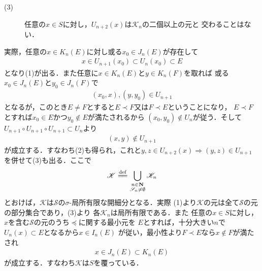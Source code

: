 \begin{prf}
\begin{description}
\begin{description}
					\item[(3)] 任意の$x \in S$に対し，$U_{n+2}(x)$は$\mathscr{K}_n$の二個以上の元と
						交わることはない．
				\end{description}
				実際，任意の$x \in K_n(E)$に対し或る$x_0 \in J_n(E)$が存在して
				\begin{align}
					x \in U_{n+1}(x_0) \subset U_n(x_0) \subset E
				\end{align}
				となり(1)が出る．また任意に$x \in K_n(E)$と$y \in K_n(F)$を取れば
				或る$x_0 \in J_n(E)$と$y_0 \in J_n(F)$で
				\begin{align}
					(x_0,x),(y,y_0) \in U_{n+1}
				\end{align}
				となるが，このとき$E \neq F$とすると$E \prec F$又は$F \prec E$ということになり，
				$E \prec F$とすれば$x_0 \in E$かつ$y_0 \notin E$が満たされるから
				$(x_0,y_0) \notin U_n$が従う．そして$U_{n+1} \circ U_{n+1} \circ U_{n+1} \subset U_n$より
				\begin{align}
					(x,y) \notin U_{n+1}
				\end{align}
				が成立する．すなわち(2)も得られ，これと$y,z \in U_{n+2}(x) \Longrightarrow (y,z) \in U_{n+1}$
				を併せて(3)も出る．ここで
				\begin{align}
					\mathscr{K} \defeq 
					\bigcup_{\substack{n \in \N \\ \mathscr{S}_n \neq \emptyset}} \mathscr{K}_n
				\end{align}
				とおけば，$\mathscr{K}$は$\mathscr{S}$の$\sigma$-局所有限な開細分となる．実際
				(1)より$\mathscr{K}$の元は全て$\mathscr{S}$の元の部分集合であり，(3)より
				各$\mathscr{K}_n$は局所有限である．また
				任意の$x \in S$に対し，$x$を含む$\mathscr{S}$の元のうち$\preceq$に関する最小元を
				$E$とすれば，十分大きい$n$で$U_n(x) \subset E$となるから$x \in I_n(E)$
				が従い，最小性より$F \prec E$なら$x \notin F$が満たされ
				\begin{align}
					x \in J_n(E) \subset K_n(E)
				\end{align}
				が成立する．すなわち$\mathscr{K}$は$S$を覆っている．
				

\end{description}
\end{prf}
